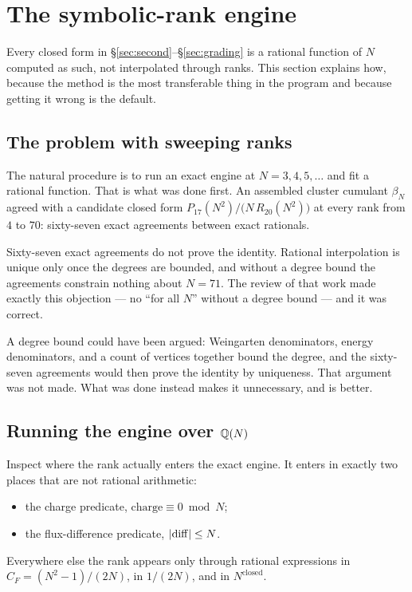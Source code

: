 \section{The symbolic-rank engine}
\label{sec:symbolic}

Every closed form in \S\ref{sec:second}--\S\ref{sec:grading} is a
rational function of $N$ computed as such, not interpolated through
ranks. This section explains how, because the method is the most
transferable thing in the program and because getting it wrong is the
default.

\subsection{The problem with sweeping ranks}

The natural procedure is to run an exact engine at $N = 3, 4, 5, \ldots$
and fit a rational function. That is what was done first. An assembled
cluster cumulant $\beta_N$ agreed with a candidate closed form
$P_{17}(N^2)\big/\big(N\,R_{20}(N^2)\big)$ at every rank from $4$ to
$70$: sixty-seven exact agreements between exact rationals.

Sixty-seven exact agreements do not prove the identity. Rational
interpolation is unique only once the degrees are bounded, and without
a degree bound the agreements constrain nothing about $N = 71$. The
review of that work made exactly this objection --- no ``for all $N$''
without a degree bound --- and it was correct.

A degree bound could have been argued: Weingarten denominators, energy
denominators, and a count of vertices together bound the degree, and
the sixty-seven agreements would then prove the identity by uniqueness.
That argument was not made. What was done instead makes it unnecessary,
and is better.

\subsection{Running the engine over \texorpdfstring{$\mathbb{Q}(N)$}{Q(N)}}

Inspect where the rank actually enters the exact engine. It enters in
exactly two places that are not rational arithmetic:
\begin{itemize}
  \item the charge predicate, $\text{charge} \equiv 0 \bmod N$;
  \item the flux-difference predicate, $\left\lvert \mathrm{diff} \right\rvert \le N$.
\end{itemize}
Everywhere else the rank appears only through rational expressions in
$C_F = (N^2-1)/(2N)$, in $1/(2N)$, and in $N^{\text{closed}}$.

